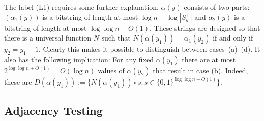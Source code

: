 \documentclass{patmorin}
\begin{document}
The label (L1) requires some further explanation. $\alpha(y)$ consists of two parts: $(\alpha_1(y))$ is a bitstring of length at most $\log n-\log |S^+_y|$ and $\alpha_2(y)$ is a bitstring of length at most $\log\log n+O(1)$.  These strings are designed so that there is a universal function $N$ such that $N(\alpha(y_1))=\alpha_1(y_2)$ if and only if $y_2=y_1+1$.  Clearly this makes it possible to distinguish between cases~(a)--(d).  It also has the following implication:  For any fixed $\alpha(y_1)$ there are at most $2^{\log \log n+O(1)}=O(\log n)$ values of $\alpha(y_2)$ that result in case (b).  Indeed, these are $D(\alpha(y_1)):=\{N(\alpha(y_1))\mathbin{\circ} s: s\in\{0,1\}^{\log\log n+O(1)}\}$.

\subsection{Adjacency Testing}
\end{document}
